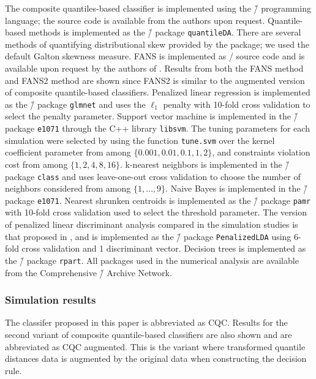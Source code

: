 The composite quantiles-based classifier is implemented using the \r/
programming language; the source code is available from the authors upon
request.  Quantile-based methods is implemented as the \r/ package
\texttt{quantileDA}.  There are several methods of quantifying distributional
skew provided by the package; we used the default Galton skewness measure.  FANS
is implemented as \matlab/ \cite{matlab} source code and is available upon
request by the authors of \cite{fan2016}.  Results from both the FANS method and
FANS2 method are shown since FANS2 is similar to the augmented version of
composite quantile-based classifiers.  Penalized linear regression is
implemented as the \r/ package \texttt{glmnet} and uses the $\ell_1$ penalty
with 10-fold cross validation to select the penalty parameter.  Support vector
machine is implemented in the \r/ package \texttt{e1071} through the C++ library
\texttt{libsvm}.  The tuning parameters for each simulation were selected by
using the function \texttt{tune.svm} over the kernel coefficient parameter from
among $\{0.001, 0.01, 0.1, 1, 2\}$, and constraints violation cost from among
$\{1, 2, 4, 8, 16\}$.  k-nearest neighbors is implemented in the \r/ package
\texttt{class} and uses leave-one-out cross validation to choose the number of
neighbors considered from among $\{1, \dots, 9\}$.  Naive Bayes is implemented
in the \r/ package \texttt{e1071}.  Nearest shrunken centroids is implemented as
the \r/ package \texttt{pamr} with 10-fold cross validation used to select the
threshold parameter.  The version of penalized linear discriminant analysis
compared in the simulation studies is that proposed in \cite{witten2011}, and is
implemented as the \r/ package \texttt{PenalizedLDA} using 6-fold cross
validation and 1 discriminant vector.  Decision trees is implemented as the \r/
package \texttt{rpart}.  All packages used in the numerical analysis are
available from the Comprehensive \r/ Archive Network.


\subsubsection{Simulation results}
\label{sec:simulation-results}

The classifer proposed in this paper is abbreviated as CQC.  Results for the
second variant of composite quantile-based classifiers are also shown and are
abbreviated as CQC augmented.  This is the variant where transformed quantile
distances data is augmented by the original data when constructing the decision
rule.

